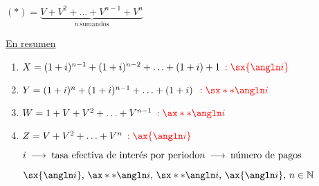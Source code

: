 $(*)=\underbrace{V+V^2+\ldots + V^{n-1}+V^n}_{\scriptstyle n\, \text{sumandos}} $

\uline{En resumen}
\begin{enumerate}[label=\protect\circled{\arabic*}]
\item $X=(1+i)^{n-1}+(1+i)^{n-2}+\ldots+(1+i) +1 \: \color{red}: \sx{\angln i}$
\color{black} \item $Y = (1+i)^n + (1+i)^{n-1}+\ldots+(1+i) \: \: \color{red}: \sx**{\angln i}$
\color{black} \item $W = 1 + V + V^2 + \ldots + V^{n-1} \: \color{red}: \ax**{\angln i}$
\color{black} \item $Z = V+V^2+\ldots +V^n \: \color{red}: \ax{\angln i}$

\color{red}$i \: \longrightarrow  \: \text{tasa efectiva de interés por periodo}\\
n \: \longrightarrow \: \text{número de pagos}$

\color{black}$\sx{\angln i}, \, \ax**{\angln i}, \, \sx**{\angln i}, \, \ax{\angln i}, \, n\in \NN$

\end{enumerate}
\color{blue}
\color{black}
